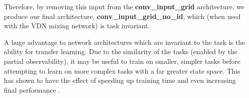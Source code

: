 Therefore, by removing this input from the \textbf{conv\_input\_grid} architecture, we produce our final architecture, \textbf{conv\_input\_grid\_no\_id}, which (when used with the VDN mixing network) is task invariant.




A huge advantage to network architectures which are invariant to the task is the ability for transfer learning. Due to the similarity of the tasks (enabled by the partial observability), it may be useful to train on smaller, simpler tasks before attempting to learn on more complex tasks with a far greater state space. This has shown to have the effect of speeding up training time and even increasing final performance \cite{curriculum}.



